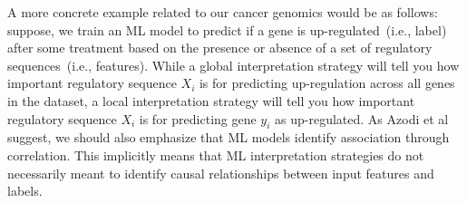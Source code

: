 \hspace*{3.5mm} A more concrete example related to our cancer genomics would be as follows: suppose, we train an ML model to predict if a gene is up-regulated~(i.e., label) after some treatment based on the presence or absence of a set of regulatory sequences~(i.e., features). While a global interpretation strategy will tell you how important regulatory sequence $X_i$ is for predicting up-regulation across all genes in the dataset, a local interpretation strategy will tell you how important regulatory sequence $X_i$ is for predicting gene $y_i$ as up-regulated. As Azodi et al~\cite{azodi2020opening} suggest, we should also emphasize that ML models identify association through correlation. This implicitly means that ML interpretation strategies do not necessarily meant to identify causal relationships between input features and labels. %

